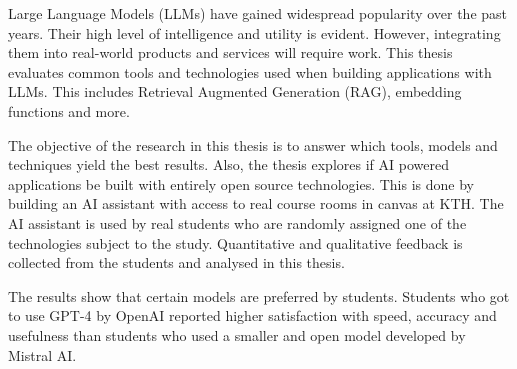 \begin{scontents}[store-env=abstracts,print-env=true]






Large Language Models (LLMs) have gained widespread popularity over the past years. Their high level of intelligence and utility is evident. However, integrating them into real-world products and services will require work. This thesis evaluates common tools and technologies used when building applications with LLMs. This includes Retrieval Augmented Generation (RAG), embedding functions and more.


The objective of the research in this thesis is to answer which tools, models and techniques yield the best results. Also, the thesis explores if AI powered applications be built with entirely open source technologies. This is done by building an AI assistant with access to real course rooms in canvas at KTH. The AI assistant is used by real students who are randomly assigned one of the technologies subject to the study. Quantitative and qualitative feedback is collected from the students and analysed in this thesis.


The results show that certain models are preferred by students. Students who got to use GPT-4 by OpenAI reported higher satisfaction with speed, accuracy and usefulness than students who used a smaller and open model developed by Mistral AI.



\end{scontents}
